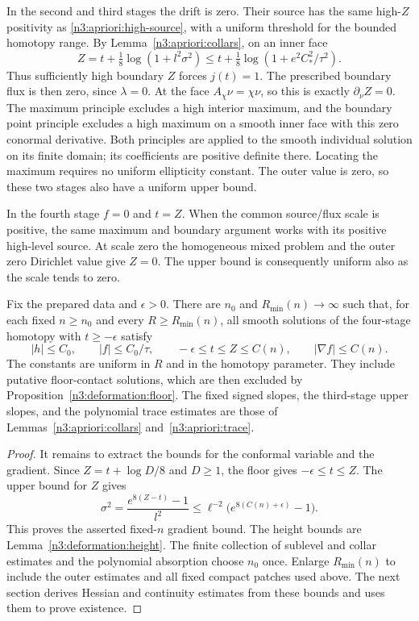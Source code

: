 In the second and third stages the drift is zero.  Their source has
the same high-$Z$ positivity as \eqref{n3:apriori:high-source}, with a
uniform threshold for the bounded homotopy range.  By
Lemma~\ref{n3:apriori:collars}, on an inner face
\begin{equation}
 Z=t+\tfrac18\log(1+l^2\sigma^2)
       \le t+\tfrac18\log(1+e^2C_*^2/\tau^2).
 \label{n3:apriori:high-boundary-t}
\end{equation}
Thus sufficiently high boundary $Z$ forces $j(t)=1$.
The prescribed boundary flux is then zero, since $\lambda=0$.
At the face $A_\chi\nu=\chi\nu$, so this is exactly
$\partial_\nu Z=0$.  The maximum principle excludes a high interior
maximum, and the boundary point principle excludes a high maximum
on a smooth inner face with this zero conormal derivative.  Both
principles are applied to the smooth individual solution on its
finite domain; its coefficients are positive definite there.
Locating the maximum requires no uniform ellipticity constant.
The outer value is zero, so these two stages also have a uniform upper
bound.

In the fourth stage $f=0$ and $t=Z$.  When the common source/flux
scale is positive, the same maximum and boundary argument works
with its positive high-level source.  At scale zero the homogeneous
mixed problem and the outer zero Dirichlet value give $Z=0$.
The upper bound is consequently uniform also as the scale tends
to zero.

\begin{proposition}
\label{n3:apriori:bounds}
Fix the prepared data and $\epsilon>0$.  There are $n_0$ and
$R_{\min}(n)\to\infty$ such that, for each fixed $n\ge n_0$ and
every $R\ge R_{\min}(n)$, all smooth solutions of the four-stage
homotopy with $t\ge-\epsilon$ satisfy
\begin{equation}
 |h|\le C_0,\qquad |f|\le C_0/\tau,\qquad
 -\epsilon\le t\le Z\le C(n),\qquad
 |\nabla f|\le C(n).
 \label{n3:apriori:bounded-variables}
\end{equation}
The constants are uniform in $R$ and in the homotopy parameter.
They include putative floor-contact solutions, which are then
excluded by Proposition~\ref{n3:deformation:floor}.
The fixed signed slopes, the third-stage upper slopes, and the
polynomial trace estimates are those of
Lemmas~\ref{n3:apriori:collars} and~\ref{n3:apriori:trace}.
\end{proposition}

\begin{proof}
It remains to extract the bounds for the conformal variable and the
gradient. Since $Z=t+\log D/8$ and $D\ge1$, the floor gives
$-\epsilon\le t\le Z$.  The upper bound for $Z$ gives
\[
 \sigma^2=\frac{e^{8(Z-t)}-1}{l^2}
       \le\ell^{-2}\bigl(e^{8(C(n)+\epsilon)}-1\bigr).
\]
This proves the asserted fixed-$n$ gradient bound.  The height bounds
are Lemma~\ref{n3:deformation:height}.  The finite collection of
sublevel and collar estimates and the polynomial absorption choose
$n_0$ once.  Enlarge $R_{\min}(n)$ to include the outer estimates and
all fixed compact patches used above. The next section derives Hessian
and continuity estimates from these bounds and uses them to prove
existence.
\end{proof}
